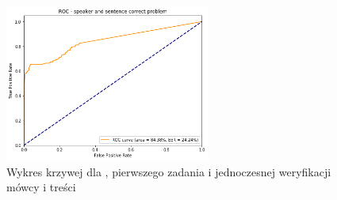 \begin{figure}[H]
    \centering
    \includegraphics[width=0.6\textwidth]{images/4_3_dnn_roc_both}
    \caption{Wykres krzywej  dla , pierwszego zadania  i jednoczesnej weryfikacji mówcy i treści}
    \label{fig:4_3_dnn_roc_both}
\end{figure}

